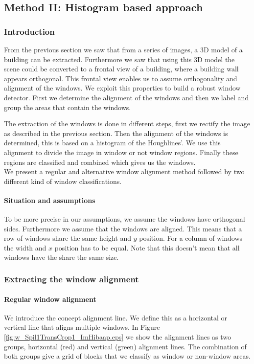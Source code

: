 \subsection{Method II: Histogram based approach} 
\subsubsection{Introduction}
From the previous section we saw that from a series of images, a 3D model of a
building can be extracted. Furthermore we saw that using this 3D model the
scene could be converted to a frontal view of a building, where a building wall
appears orthogonal.  This frontal view enables us to assume orthogonality and
alignment of the windows. 
We exploit this properties to build a robust window detector. First we determine
the alignment of the windows and then we label and group the areas that
contain the windows. 


The extraction of the windows is done in different steps, first we rectify the
image as described in the previous section.  Then the alignment of the windows
is determined, this is based on a histogram of the Houghlines'. We use this
alignment to divide the image in window or not window regions.  Finally these
regions are classified and combined which gives us the windows.\\
We present a regular and alternative window alignment method
followed by two different kind of window classifications. 


\paragraph{Situation and assumptions}
To be more precise in our assumptions, we assume the windows have orthogonal
sides.  Furthermore we assume that the windows are aligned. This means that a
row of windows share the same height and $y$ position. For a column of windows
the width and $x$ position has to be equal.  Note that this doesn't mean that
all windows have the share the same size.



\subsubsection{Extracting the window alignment}
\paragraph{Regular window alignment}
We introduce the concept alignment line. We define this as a horizontal or
vertical line that aligns multiple windows. In Figure
\ref{fig:w_Spil1TransCrop1_ImHibaap.eps}
we show the alignment lines as two groups, horizontal (red) and
vertical (green) alignment lines.  The combination of both groups give a grid of
blocks that we classify as window or non-window areas.\\

